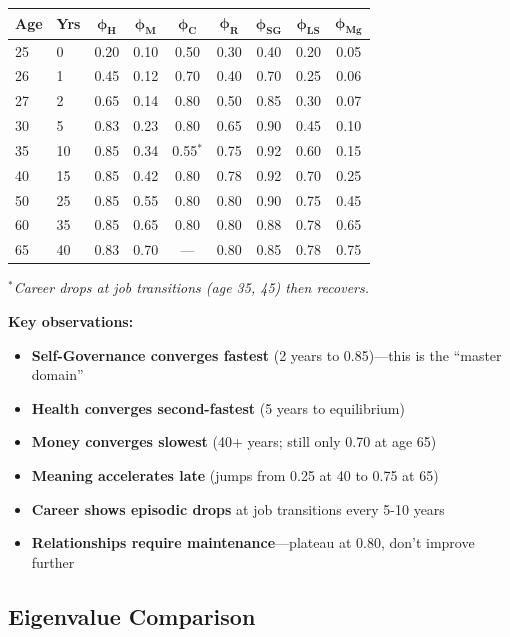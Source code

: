 \begin{center}
\footnotesize
\begin{tabular}{@{}ll|ccccccc@{}}
\toprule
\textbf{Age} & \textbf{Yrs} & $\boldsymbol{\phi_H}$ & $\boldsymbol{\phi_M}$ & $\boldsymbol{\phi_C}$ & $\boldsymbol{\phi_R}$ & $\boldsymbol{\phi_{SG}}$ & $\boldsymbol{\phi_{LS}}$ & $\boldsymbol{\phi_{Mg}}$ \\
\midrule
25 & 0 & 0.20 & 0.10 & 0.50 & 0.30 & 0.40 & 0.20 & 0.05 \\
26 & 1 & 0.45 & 0.12 & 0.70 & 0.40 & 0.70 & 0.25 & 0.06 \\
27 & 2 & 0.65 & 0.14 & 0.80 & 0.50 & 0.85 & 0.30 & 0.07 \\
30 & 5 & 0.83 & 0.23 & 0.80 & 0.65 & 0.90 & 0.45 & 0.10 \\
35 & 10 & 0.85 & 0.34 & 0.55$^*$ & 0.75 & 0.92 & 0.60 & 0.15 \\
40 & 15 & 0.85 & 0.42 & 0.80 & 0.78 & 0.92 & 0.70 & 0.25 \\
50 & 25 & 0.85 & 0.55 & 0.80 & 0.80 & 0.90 & 0.75 & 0.45 \\
60 & 35 & 0.85 & 0.65 & 0.80 & 0.80 & 0.88 & 0.78 & 0.65 \\
65 & 40 & 0.83 & 0.70 & — & 0.80 & 0.85 & 0.78 & 0.75 \\
\bottomrule
\end{tabular}
\end{center}
\textit{$^*$Career drops at job transitions (age 35, 45) then recovers.}

\textbf{Key observations:}
\begin{itemize}[nosep]
\item \textbf{Self-Governance converges fastest} (2 years to 0.85)---this is the ``master domain''
\item \textbf{Health converges second-fastest} (5 years to equilibrium)
\item \textbf{Money converges slowest} (40+ years; still only 0.70 at age 65)
\item \textbf{Meaning accelerates late} (jumps from 0.25 at 40 to 0.75 at 65)
\item \textbf{Career shows episodic drops} at job transitions every 5-10 years
\item \textbf{Relationships require maintenance}---plateau at 0.80, don't improve further
\end{itemize}

\subsection{Eigenvalue Comparison}

